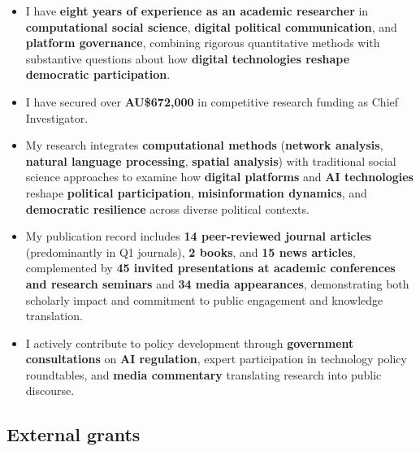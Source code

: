 \documentclass[12pt,a4paper,sans]{moderncv}
\begin{document}
\begin{boxH}

\begin{itemize}

\item I have \textbf{eight years of experience as an academic researcher} in \textbf{computational social science}, \textbf{digital political communication}, and \textbf{platform governance}, combining rigorous quantitative methods with substantive questions about how \textbf{digital technologies reshape democratic participation}.

\item I have secured over \textbf{AU\$672,000} in competitive research funding as Chief Investigator.

\item My research integrates \textbf{computational methods} (\textbf{network analysis}, \textbf{natural language processing}, \textbf{spatial analysis}) with traditional social science approaches to examine how \textbf{digital platforms} and \textbf{AI technologies} reshape \textbf{political participation}, \textbf{misinformation dynamics}, and \textbf{democratic resilience} across diverse political contexts.

\item My publication record includes \textbf{14 peer-reviewed journal articles} (predominantly in Q1 journals), \textbf{2 books}, and \textbf{15 news articles}, complemented by \textbf{45 invited presentations at academic conferences and research seminars} and \textbf{34 media appearances}, demonstrating both scholarly impact and commitment to public engagement and knowledge translation.

\item I actively contribute to policy development through \textbf{government consultations} on \textbf{AI regulation}, expert participation in technology policy roundtables, and \textbf{media commentary} translating research into public discourse.

\end{itemize}

\end{boxH}

\subsection{\hspace{-2.5cm}External grants}

\vspace{.5em}
\end{document}
